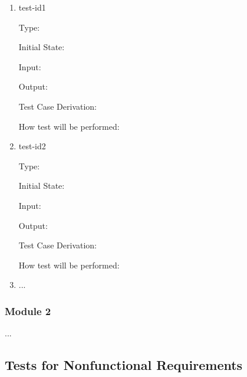 \documentclass[12pt, titlepage]{article}
\renewcommand{\wss}[1]{}
\begin{document}
\begin{enumerate}

\item{test-id1\\}

Type: \wss{Functional, Dynamic, Manual, Automatic, Static etc. Most will
  be automatic}
					
Initial State: 
					
Input: 
					
Output: \wss{The expected result for the given inputs}

Test Case Derivation: \wss{Justify the expected value given in the Output field}

How test will be performed: 
					
\item{test-id2\\}

Type: \wss{Functional, Dynamic, Manual, Automatic, Static etc. Most will
  be automatic}
					
Initial State: 
					
Input: 
					
Output: \wss{The expected result for the given inputs}

Test Case Derivation: \wss{Justify the expected value given in the Output field}

How test will be performed: 

\item{...\\}
    
\end{enumerate}

\subsubsection{Module 2}

...

\subsection{Tests for Nonfunctional Requirements}

\wss{If there is a module that needs to be independently assessed for
  performance, those test cases can go here.  In some projects, planning for
  nonfunctional tests of units will not be that relevant.}

\wss{These tests may involve collecting performance data from previously
  mentioned functional tests.}
\end{document}
